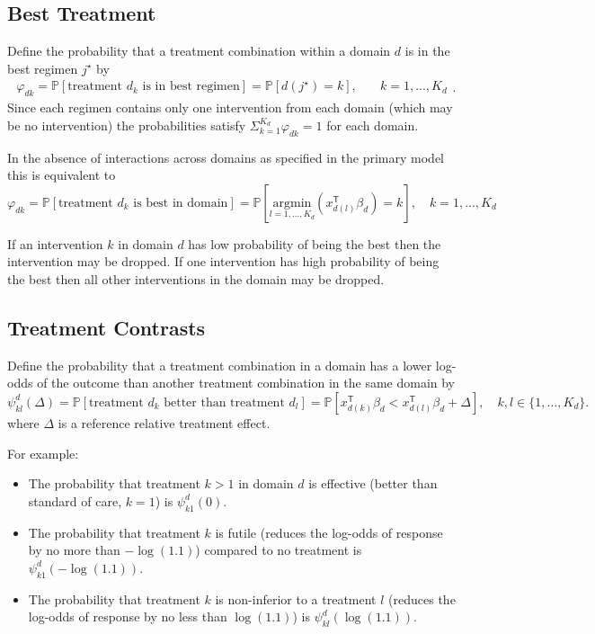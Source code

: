 \documentclass[
  11pt,
]{article}
\providecommand{\tightlist}{%
  \setlength{\itemsep}{0pt}\setlength{\parskip}{0pt}}
\begin{document}
\hypertarget{best-treatment}{%
\subsection{Best Treatment}\label{best-treatment}}

Define the probability that a treatment combination within a domain \(d\) is in the best regimen \(j^\star\) by
\[
\begin{aligned}
\varphi_{dk} = \mathbb P[\text{treatment }d_k\text{ is in best regimen}] = \mathbb P[d(j^\star)=k],&\quad k=1,...,K_d
\end{aligned}.
\]
Since each regimen contains only one intervention from each domain (which may be no intervention) the probabilities satisfy \(\Sigma_{k=1}^{K_d}\varphi_{dk} = 1\) for each domain.

In the absence of interactions across domains as specified in the primary model this is equivalent to
\[
\varphi_{dk} = \mathbb P[\text{treatment }d_k\text{ is best in domain}] = \mathbb P\left[\underset{l=1,...,K_d}{\text{argmin}} (x_{d(l)}^{\mathsf{T}}\beta_d)=k\right],\quad k=1,...,K_d
\]

If an intervention \(k\) in domain \(d\) has low probability of being the best then the intervention may be dropped.
If one intervention has high probability of being the best then all other interventions in the domain may be dropped.

\hypertarget{treatment-contrasts}{%
\subsection{Treatment Contrasts}\label{treatment-contrasts}}

Define the probability that a treatment combination in a domain has a lower log-odds of the outcome than another treatment combination in the same domain by
\[
\psi_{kl}^d(\Delta)=\mathbb P[\text{treatment }d_k\text{ better than treatment } d_l] =\mathbb P\left[x_{d(k)}^{\mathsf{T}}\beta_d < x_{d(l)}^{\mathsf{T}}\beta_d+\Delta\right],\quad k,l\in\{1,...,K_d\}.
\]
where \(\Delta\) is a reference relative treatment effect.

For example:

\begin{itemize}
\tightlist
\item
  The probability that treatment \(k>1\) in domain \(d\) is effective (better than standard of care, \(k=1\)) is \(\psi_{k1}^d(0)\).
\item
  The probability that treatment \(k\) is futile (reduces the log-odds of response by no more than \(-\log(1.1)\)) compared to no treatment is \(\psi_{k1}^d(-\log(1.1))\).
\item
  The probability that treatment \(k\) is non-inferior to a treatment \(l\) (reduces the log-odds of response by no less than \(\log(1.1)\)) is \(\psi^d_{kl}(\log(1.1))\).
\end{itemize}
\end{document}

